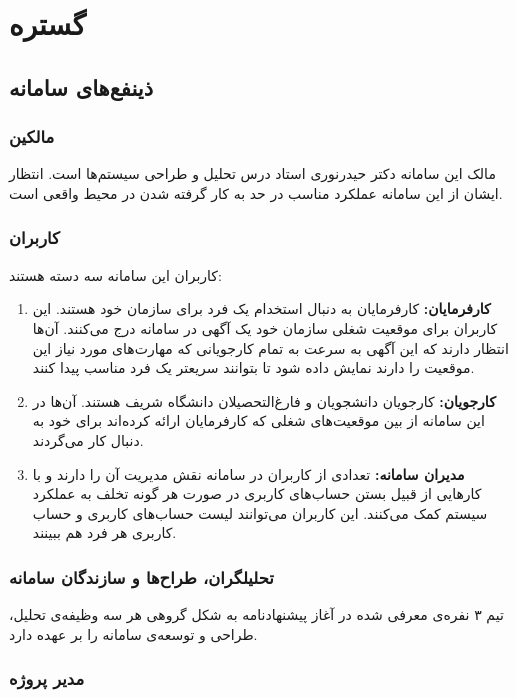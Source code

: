 
\makeatletter
\def\titlefootnote{\ifx\protect\@typeset@protect\expandafter\LTRfootnote\else\expandafter\@gobble\fi}
\makeatother

\chapter{گستره}
	\section{ذینفع‌های سامانه \titlefootnote{Stakeholders}
	}
	\subsection{مالکین}
	مالک این سامانه دکتر حیدرنوری استاد درس تحلیل و طراحی سیستم‌ها است. انتظار ایشان از این سامانه عملکرد مناسب در حد به کار گرفته شدن در محیط واقعی است.
	
	\subsection{کاربران}
	کاربران این سامانه سه دسته هستند:
\begin{enumerate}
\item \textbf{کارفرمایان:}
	کارفرمایان به دنبال استخدام یک فرد برای سازمان خود هستند. این کاربران برای موقعیت شغلی سازمان خود یک آگهی در سامانه درج می‌کنند. آن‌ها انتظار دارند که این آگهی به سرعت به تمام کارجویانی که مهارت‌های مورد نیاز این موقعیت را دارند نمایش داده شود تا بتوانند سریعتر یک فرد مناسب پیدا کنند.
\item \textbf{کارجویان:}
 کارجویان دانشجویان و فارغ‌التحصیلان دانشگاه شریف هستند. آن‌ها در این سامانه از بین موقعیت‌های شغلی که کارفرمایان ارائه کرده‌اند برای خود به دنبال کار می‌گردند.
\item \textbf{مدیران سامانه:}
 تعدادی از کاربران در سامانه نقش مدیریت ‌آن‌ را دارند و با کارهایی از قبیل بستن حساب‌های کاربری در صورت هر گونه تخلف به عملکرد سیستم کمک می‌کنند. این کاربران می‌توانند لیست حساب‌های کاربری و حساب کاربری هر فرد هم ببینند.
\end{enumerate}

\subsection{تحلیلگران، طراح‌ها و سازندگان سامانه}

تیم ۳ نفره‌ی معرفی شده در آغاز پیشنهادنامه به شکل گروهی هر سه وظیفه‌ی تحلیل، طراحی و توسعه‌ی سامانه را بر عهده دارد.

\subsection{مدیر پروژه}


